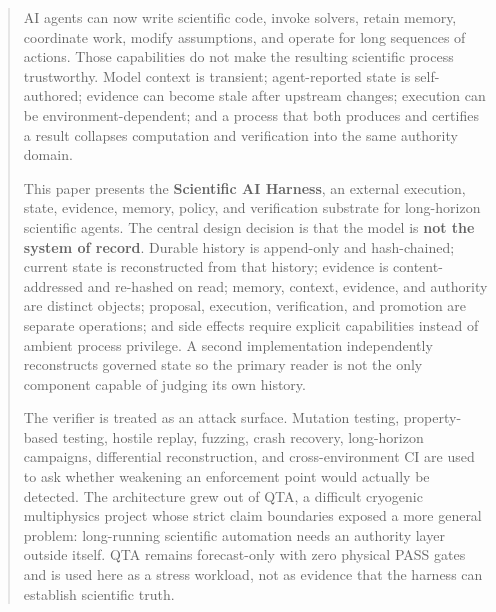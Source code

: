 \begin{abstract}
AI agents can now write scientific code, invoke solvers, retain memory, coordinate work, modify assumptions, and operate for long sequences of actions. Those capabilities do not make the resulting scientific process trustworthy. Model context is transient; agent-reported state is self-authored; evidence can become stale after upstream changes; execution can be environment-dependent; and a process that both produces and certifies a result collapses computation and verification into the same authority domain.

This paper presents the \textbf{Scientific AI Harness}, an external execution, state, evidence, memory, policy, and verification substrate for long-horizon scientific agents. The central design decision is that the model is \textbf{not the system of record}. Durable history is append-only and hash-chained; current state is reconstructed from that history; evidence is content-addressed and re-hashed on read; memory, context, evidence, and authority are distinct objects; proposal, execution, verification, and promotion are separate operations; and side effects require explicit capabilities instead of ambient process privilege. A second implementation independently reconstructs governed state so the primary reader is not the only component capable of judging its own history.

The verifier is treated as an attack surface. Mutation testing, property-based testing, hostile replay, fuzzing, crash recovery, long-horizon campaigns, differential reconstruction, and cross-environment CI are used to ask whether weakening an enforcement point would actually be detected. The architecture grew out of QTA, a difficult cryogenic multiphysics project whose strict claim boundaries exposed a more general problem: long-running scientific automation needs an authority layer outside itself. QTA remains forecast-only with zero physical PASS gates and is used here as a stress workload, not as evidence that the harness can establish scientific truth.
\end{abstract}

\tableofcontents
\clearpage
{}

